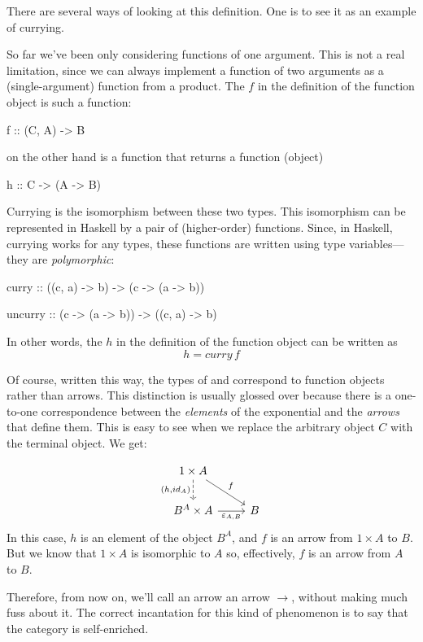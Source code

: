 \documentclass[DaoFP]{subfiles}
\begin{document}
There are several ways of looking at this definition. One is to see it as an example of currying. 

So far we've been only considering functions of one argument. This is not a real limitation, since we can always implement a function of two arguments as a (single-argument) function from a product. The $f$ in the definition of the function object is such a function:
\begin{haskell}
f :: (C, A) -> B
\end{haskell}
 on the other hand is a function that returns a function (object)
\begin{haskell}
h :: C -> (A -> B)
\end{haskell}
Currying is the isomorphism between these two types. This isomorphism can be represented in Haskell by a pair of (higher-order) functions. Since, in Haskell, currying works for any types, these functions are written using type variables---they are \emph{polymorphic}:
\begin{haskell}
curry   :: ((c, a) -> b)   -> (c -> (a -> b))
\end{haskell}

\begin{haskell}
uncurry :: (c -> (a -> b)) -> ((c, a) -> b)
\end{haskell}
In other words, the $h$ in the definition of the function object can be written as 
\[ h = curry\, f \]

Of course, written this way, the types of  and  correspond to function objects rather than arrows. This distinction is usually glossed over because there is a one-to-one correspondence between the \emph{elements} of the exponential and the \emph{arrows} that define them. This is easy to see when we replace the arbitrary object $C$ with the terminal object. We get:

\[
 \begin{tikzcd}
 1 \times A
 \arrow[d, dashed, "{(h, id_A)}"']
 \arrow[rd, "f"]
 \\
 B^A \times A
 \arrow[r, "\varepsilon_{A, B}"']
& B
 \end{tikzcd}
\]
In this case, $h$ is an element of the object $B^A$, and $f$ is an arrow from $1 \times A$ to $B$. But we know that $1 \times A$ is isomorphic to $A$ so, effectively, $f$ is an arrow from $A$ to $B$. 

Therefore, from now on, we'll call an arrow \hask{->} an arrow $\to$, without making much fuss about it. The correct incantation for this kind of phenomenon is to say that the category is self-enriched.
\end{document}
